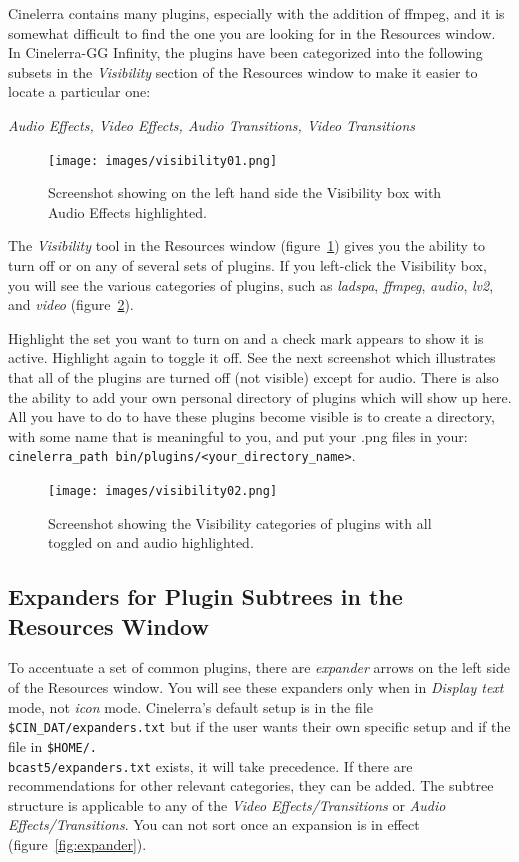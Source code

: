 Cinelerra contains many plugins, especially with the addition of ffmpeg, and it is somewhat difficult to find the one you are looking for in the Resources window. In Cinelerra-GG Infinity, the plugins have been categorized into the following subsets in the \textit{Visibility} section of the Resources window to make it easier to locate a particular one:

\textit{Audio Effects, \quad Video Effects, \quad Audio Transitions, \quad Video Transitions}

\begin{figure}[htpb]
    \centering
    \texttt{[image: images/visibility01.png]}
    \caption{Screenshot showing on the left hand side the Visibility box with Audio Effects highlighted.}
    \label{fig:visibility01}
\end{figure}

The \textit{Visibility} tool in the Resources window (figure~\ref{fig:visibility01}) gives you the ability to turn off or on any of several sets of plugins. If you left-click the Visibility box, you will see the various categories of plugins, such as \textit{ladspa}, \textit{ffmpeg}, \textit{audio}, \textit{lv2}, and \textit{video} (figure~\ref{fig:visibility02}).

Highlight the set you want to turn on and a check mark appears to show it is active. Highlight again to toggle it off. See the next screenshot which illustrates that all of the plugins are turned off (not visible) except for audio. There is also the ability to add your own personal directory of plugins which will show up here. All you have to do to have these plugins become visible is to create a directory, with some name that is meaningful to you, and put your .png files in your: \\
\texttt{cinelerra\_path bin/plugins/<your\_directory\_name>}.

\begin{figure}[htpb]
    \centering
    \texttt{[image: images/visibility02.png]}
    \caption{Screenshot showing the Visibility categories of plugins with all toggled on and audio highlighted.}
    \label{fig:visibility02}
\end{figure}

\subsection{Expanders for Plugin Subtrees in the Resources Window}%
\label{sub:expanders_plugin_subtrees}

To accentuate a set of common plugins, there are \textit{expander} arrows on the left side of the Resources window. You will see these expanders only when in \textit{Display text} mode, not \textit{icon} mode. 
Cinelerra’s default setup is in the file \texttt{\$CIN\_DAT/expan\-ders.txt} but if the user wants their own specific setup and if the file in \texttt{\$HOME/.\\bcast5/expanders.txt} exists, it will take precedence. 
If there are recommendations for other relevant categories, they can be added. The subtree structure is applicable to any of the \textit{Video Effects/Transitions} or \textit{Audio Effects/Transitions}. You can not sort once an expansion is in effect (figure~\ref{fig:expander}).


